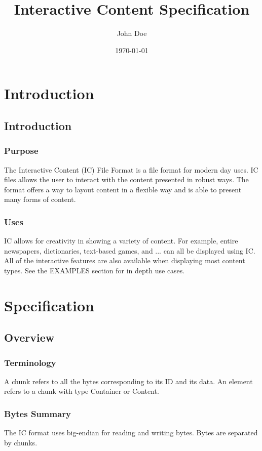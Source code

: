 \documentclass{report}
\title{Interactive Content Specification}
\author{John Doe}
\date{\today}
\begin{document}
\maketitle

\tableofcontents

\part{Introduction}

\chapter{Introduction}

\section{Purpose}
The Interactive Content (IC) File Format is a file format for modern day uses. 
IC files allows the user to interact with the content presented in robust ways.
The format offers a way to layout content in a flexible way and is able to present many forms of content.

\section{Uses}
IC allows for creativity in showing a variety of content. For example, entire newspapers, dictionaries, text-based games, and ... can all be displayed using IC. All of the interactive features are also available when displaying most content types. See the EXAMPLES section for in depth use cases.

\part{Specification}

\chapter{Overview}
\section{Terminology}
A chunk refers to all the bytes corresponding to its ID and its data.
An element refers to a chunk with type Container or Content.

\section{Bytes Summary}
The IC format uses big-endian for reading and writing bytes. Bytes are separated by chunks.
\end{document}

